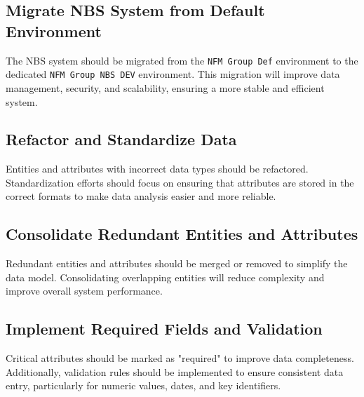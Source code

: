 \subsection{Migrate NBS System from Default Environment}
The NBS system should be migrated from the \texttt{NFM Group Def} environment to the dedicated \texttt{NFM Group NBS DEV} environment. This migration will improve data management, security, and scalability, ensuring a more stable and efficient system.

\subsection{Refactor and Standardize Data}
Entities and attributes with incorrect data types should be refactored. Standardization efforts should focus on ensuring that attributes are stored in the correct formats to make data analysis easier and more reliable.

\subsection{Consolidate Redundant Entities and Attributes}
Redundant entities and attributes should be merged or removed to simplify the data model. Consolidating overlapping entities will reduce complexity and improve overall system performance.

\subsection{Implement Required Fields and Validation}
Critical attributes should be marked as "required" to improve data completeness. Additionally, validation rules should be implemented to ensure consistent data entry, particularly for numeric values, dates, and key identifiers.

\newpage